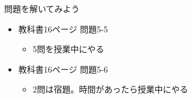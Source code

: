 \documentclass[slide05.tex]{subfiles}
\begin{document}
\begin{frame}[fragile]
    \begin{exampleblock}{問題を解いてみよう}
    \begin{itemize}
        \item 教科書16ページ 問題5-5
        \begin{itemize}
            \item 5問を授業中にやる
        \end{itemize}
        \item 教科書16ページ 問題5-6
        \begin{itemize}
            \item 2問は宿題。時間があったら授業中にやる
        \end{itemize}
    \end{itemize}
    \end{exampleblock}
\end{frame}
\end{document}
